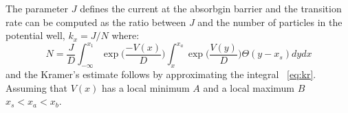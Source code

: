 The parameter $J$ defines the current at the absorbgin barrier and the transition rate can be computed as the ratio between $J$ and the number of particles in the potential well, $k_x = J/N$ where:
\begin{equation}
N = \frac{J}{D} \int_{-\infty}^{x_1} \exp \biggl(\frac{-V(x)}{D} \biggr) \int_x^{x_a} \exp \biggl(\frac{V(y)}{D} \biggr) \Theta (y-x_s) dydx
\label{eq:kr}
\end{equation}
and the Kramer's estimate follows by approximating the integral ~\ref{eq:kr}. Assuming that $V(x)$ has a local minimum $A$ and a local maximum $B$ $x_s < x_a <x_b $. 
